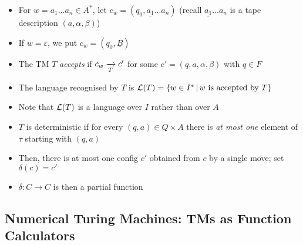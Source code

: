 \begin{itemize}
	
	\item For $ w = a_1 \dots a_n \in A^* $, let $ c_w = (q_0, \underline{a_1} \dots a_n) $ (recall $ \underline{a_1} \dots a_n $ is a tape description $ (a, \alpha, \beta) $)
	
	\item If $ w = \varepsilon $, we put $ c_w = (q_0, \underline{B}) $
	
	\item The TM $ T $ \textit{accepts} if $ c_w \xrightarrow[T]{} c' $ for some $ c' = (q, a, \alpha, \beta) $ with $ q \in F $
	
	\item The language recognised by $ T $ is $ \mathcal{L}(T) = \left\lbrace w \in I^* \, | \, w \text{ is accepted by } T  \right\rbrace $
	
	\item Note that $ \mathcal{L}(T) $ is a language over $ I $ rather than over $ A $
	
	\item $ T $ is deterministic if for every $ (q, a) \in Q \times A $ there is \textit{at most one} element of $ \tau $ starting with $ (q, a) $
	
	\item Then, there is at most one config $ c' $ obtained from $ c $ by a single move; set $ \delta(c) = c' $
	
	\item $ \delta: C \to C $ is then a partial function
	
\end{itemize}

\clearpage

\subsection{Numerical Turing Machines: TMs as Function Calculators}

